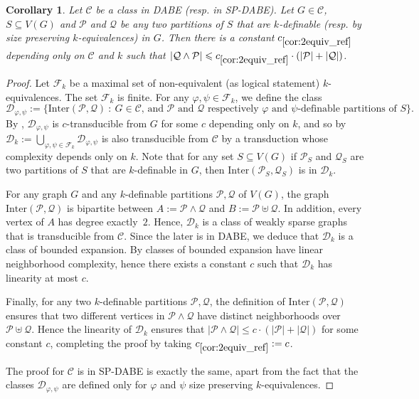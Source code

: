 \documentclass[11pt]{article}
\newtheorem{corollary}[theorem]{Corollary}
\theoremstyle{definition}
\newcommand{\CC}{{\mathscr C}}
\newcommand{\DD}{{\mathscr D}}
\renewcommand{\le}{\leqslant}
\let\phi\varphi
\newcommand{\Pp}{\mathcal{P}}
\newcommand{\Qq}{\mathcal{Q}}
\begin{document}
\begin{corollary}\label{cor:2equiv_ref}
    Let $\CC$ be a class in DABE (resp. in SP-DABE).
    Let $G \in \CC$, $S \subseteq V(G)$ and $\Pp$ and $\Qq$ be any two partitions of $S$ that are $k$-definable (resp. by size preserving $k$-equivalences) in $G$.
    Then there is a constant $c_{\ref{cor:2equiv_ref}}$ depending only on $\CC$ and $k$ such that $|\Qq \wedge \Pp| \le c_{\ref{cor:2equiv_ref}} \cdot (|\Pp| + |\Qq|)$.
\end{corollary}
\begin{proof}
Let $\mathcal F_k$ be a maximal set of non-equivalent (as logical statement) $k$-equivalences. The set $\mathcal F_k$ is finite.
For any $\phi, \psi \in \mathcal F_k$, we define the class
\[
\DD_{\phi, \psi} :=
\{\text{Inter}(\Pp,\Qq) ~:~ G \in \CC \text{, and $\Pp$ and $\Qq$ respectively $\phi$ and $\psi$-definable partitions of } S\}.
\]
By , $\DD_{\phi, \psi}$ is $c$-transducible from $G$ for some $c$ depending only on $k$, and so by  $\DD_k := \bigcup_{\phi, \psi \in \mathcal F_k} \DD_{\phi, \psi}$ is also transducible from $\CC$ by a transduction whose complexity depends only on $k$.
Note that for any set $S \subseteq V(G)$ if $\Pp_S$ and $\Qq_S$ are two partitions of $S$ that are $k$-definable in $G$, then $\text{Inter}(\Pp_S, \Qq_S)$ is in $\DD_k$.

For any graph $G$ and any $k$-definable partitions $\Pp, \Qq$ of $V(G)$, the graph $\text{Inter}(\Pp, \Qq)$ is bipartite between $A := \Pp \wedge \Qq$ and $B := \Pp \uplus \Qq$.
In addition, every vertex of $A$ has degree exactly~$2$.
Hence, $\DD_k$ is a class of weakly sparse graphs that is transducible from $\CC$.
Since the later is in DABE, we deduce that $\DD_k$ is a class of bounded expansion.
By  classes of bounded expansion have linear neighborhood complexity, hence there exists a constant $c$ such that $\DD_k$ has linearity at most $c$.

Finally, for any two $k$-definable partitions $\Pp, \Qq$, the definition of $\text{Inter}(\Pp, \Qq)$ ensures that two different vertices in $\Pp \wedge \Qq$ have distinct neighborhoods over $\Pp \uplus \Qq$. Hence the linearity of $\DD_k$ ensures that $|\Pp \wedge \Qq| \le c \cdot (|\Pp| + |\Qq|)$ for some constant $c$, completing the proof by taking $c_{\ref{cor:2equiv_ref}} := c$.


The proof for $\CC$ is in SP-DABE is exactly the same, apart from the fact that the classes $\DD_{\phi, \psi}$ are defined only for $\phi$ and $\psi$ size preserving $k$-equivalences.
\end{proof}
\end{document}
